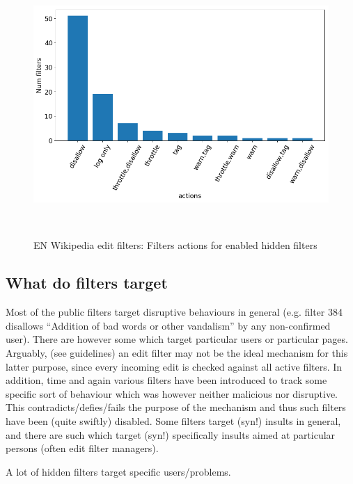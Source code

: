 \begin{figure}
\centering
  \includegraphics[width=0.9\columnwidth]{pics/active-hidden-actions-big.png}
  \caption{EN Wikipedia edit filters: Filters actions for enabled hidden filters}~\label{fig:active-hidden-actions}
\end{figure}

\subsection{What do filters target}%

Most of the public filters target disruptive behaviours in general (e.g. filter 384 disallows ``Addition of bad words or other vandalism'' by any non-confirmed user).
There are however some which target particular users or particular pages.
Arguably, (see guidelines) an edit filter may not be the ideal mechanism for this latter purpose, since every incoming edit is checked against all active filters.
In addition, time and again various filters have been introduced to track some specific sort of behaviour which was however neither malicious nor disruptive.
This contradicts/defies/fails the purpose of the mechanism and thus such filters have been (quite swiftly) disabled.
Some filters target (syn!) insults in general, and there are such which target (syn!) specifically insults aimed at particular persons (often edit filter managers).

A lot of hidden filters target specific users/problems.

